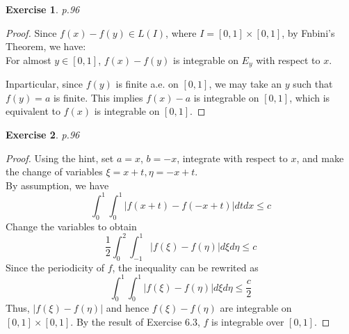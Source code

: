 \documentclass[11pt,a4paper]{article}
\renewcommand{\(}{\left(}
\renewcommand{\)}{\right)}
\renewcommand{\[}{\left[}
\renewcommand{\]}{\right]}
\newtheorem{exercise}{Exercise}
\begin{document}
  \setcounter{exercise}{2}
  \begin{exercise}
  	p.96
  \end{exercise}
  \begin{proof}
  	Since $f(x)-f(y) \in L(I)$, where $I = [0,1]\times [0,1]$, by Fnbini's Theorem, we have: \\
  	For almost $y \in [0,1]$, $f(x)-f(y)$ is integrable on $E_y$ with respect to $x$.
  	
  	Inparticular, since $f(y)$ is finite a.e. on $[0,1]$, we may take an $y$ such that $f(y)=a$ is finite. This implies $f(x)-a$ is integrable on $[0,1]$, which is equivalent to $f(x)$ is integrable on $[0,1]$.
  \end{proof}
  
  \begin{exercise}
  	p.96
  \end{exercise}
  \begin{proof}
  	Using the hint, set $a=x$, $b=-x$,  integrate with respect to $x$, and make the change of variables $\xi=x+t, \eta=-x+t$.\\
  	By assumption, we have
  	$$\int_{0}^{1}\int_{0}^{1}\left| f(x+t)-f(-x+t)\right| dtdx \le c$$
  	Change the variables to obtain
  	$$\frac{1}{2}\int_{0}^{2}\int_{-1}^{1}|f(\xi)-f(\eta)|d\xi d\eta \le c$$
  	Since the periodicity of $f$, the inequality can be rewrited as
  	$$\int_{0}^{1}\int_{0}^{1}|f(\xi)-f(\eta)|d\xi d\eta \le \frac{c}{2}$$
  	Thus, $|f(\xi)-f(\eta)|$ and hence $f(\xi)-f(\eta)$ are integrable on $[0,1]\times[0,1]$. By the result of Exercise 6.3, $f$ is integrable over $[0,1]$.
  	
  \end{proof}
\end{document}
